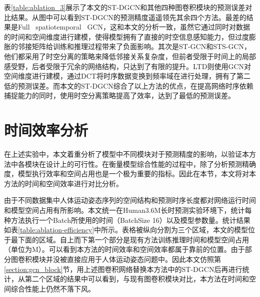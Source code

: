 表\ref{table:ablation_3}展示了本文的ST-DGCN和其他四种图卷积模块的预测误差对比结果。从图中可以看到ST-DGCN的预测精度遥遥领先其余四个方法。最差的结果是Full \ spatiotemporal \ GCN，这和本文的分析一致，虽然它通过同时对数据的时间和空间维度进行建模，使得模型拥有了直接的时空信息感知能力，但过度膨胀的邻接矩阵给训练和推理过程带来了负面影响。其次是ST-GCN和STS-GCN，他们都采用了时空分离的策略来降低邻接关系复杂度，但前者受限于时间上的局部感受野，后者受限于冗余的网络结构，只达到了有限的提升。LTD则使用GCN对空间维度进行建模，通过DCT将时序数据变换到频率域在进行处理，拥有了第二低的预测误差。而本文的ST-DGCN综合了以上方法的优点，在提高网络时序依赖捕捉能力的同时，使用时空分离策略提高了效率，达到了最低的预测误差。

\section{时间效率分析}
在上述实验中，本文着重分析了模型中不同模块对于预测精度的影响，以验证本方法中各模块在设计上的可行性。在衡量模型综合性能的过程中，除了分析预测精确度，模型执行效率和空间占用也是一个极为重要的指标。因此在本节，本文将对本方法的时间和空间效率进行对比分析。

\begin{table}[ht]
    \centering
    \caption{时间效率和模型空间占用对比}\label{table:ablation-efficiency}
    \end{table}
由于不同数据集中人体运动姿态序列的空间结构和预测时序长度都对网络运行时间和模型空间占用有所影响。本文统一在Human3.6M长时预测实验环境下，统计每种方法执行一个Batch所使用的时间（BatchSize 16）以及模型参数量。统计结果如表\ref{table:ablation-efficiency}中所示。表格被纵向分割为三个区域，本文的模型位于最下面的区域。自上而下第一个部分是现有方法训练推理时间和模型空间占用（单位为M）。可以看到本方法的时间效率和空间效率都属于靠前的位置。由于部分图卷积模块并没被直接应用于人体运动姿态问题中。因此本文仿照第\ref{section:gcn_block}节，用上述图卷积网络替换本方法中的ST-DGCN后再进行统计，从第二个区域的结果中可以看到，与现有图卷积模块对比，本方法在时间和空间综合性能上仍然不落下风。

